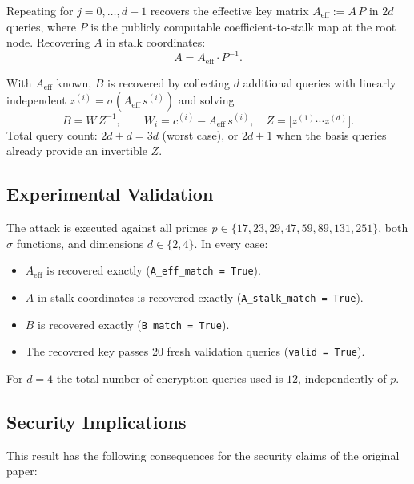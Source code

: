 \documentclass[12pt,a4paper]{article}
\theoremstyle{definition}
\begin{document}
Repeating for $j = 0, \ldots, d-1$ recovers the effective key
matrix $A_{\text{eff}} := A\,P$ in $2d$ queries, where $P$ is the
publicly computable coefficient-to-stalk map at the root node.
Recovering $A$ in stalk coordinates:
\begin{equation}
  A = A_{\text{eff}} \cdot P^{-1}.
\end{equation}

With $A_{\text{eff}}$ known, $B$ is recovered by collecting $d$
additional queries with linearly independent
$z^{(i)} = \sigma(A_{\text{eff}}\,s^{(i)})$ and solving
\begin{equation}\label{eq:B-recovery}
  B = W\,Z^{-1}, \qquad
  W_i = c^{(i)} - A_{\text{eff}}\,s^{(i)}, \quad
  Z = \bigl[z^{(1)} \cdots z^{(d)}\bigr].
\end{equation}
Total query count: $2d + d = 3d$ (worst case), or $2d + 1$ when
the basis queries already provide an invertible $Z$.

\subsection{Experimental Validation}

The attack is executed against all primes
$p \in \{17, 23, 29, 47, 59, 89, 131, 251\}$, both $\sigma$
functions, and dimensions $d \in \{2, 4\}$. In every case:

\begin{itemize}
  \item $A_{\text{eff}}$ is recovered exactly (\texttt{A\_eff\_match = True}).
  \item $A$ in stalk coordinates is recovered exactly (\texttt{A\_stalk\_match = True}).
  \item $B$ is recovered exactly (\texttt{B\_match = True}).
  \item The recovered key passes 20 fresh validation queries
    (\texttt{valid = True}).
\end{itemize}

For $d = 4$ the total number of encryption queries used is $12$,
independently of $p$.

\subsection{Security Implications}
\label{sub:implications}

This result has the following consequences for the security claims
of the original paper:
\end{document}
